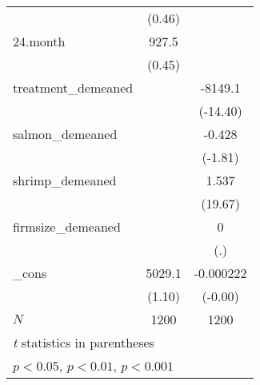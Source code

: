 {\begin{tabular}{l*{2}{c}}
            &      (0.46)         &                     \\
[1em]
24.month    &       927.5         &                     \\
            &      (0.45)         &                     \\
[1em]
treatment\_demeaned&                     &     -8149.1\sym{***}\\
            &                     &    (-14.40)         \\
[1em]
salmon\_demeaned&                     &      -0.428         \\
            &                     &     (-1.81)         \\
[1em]
shrimp\_demeaned&                     &       1.537\sym{***}\\
            &                     &     (19.67)         \\
[1em]
firmsize\_demeaned&                     &           0         \\
            &                     &         (.)         \\
[1em]
\_cons      &      5029.1         &   -0.000222         \\
            &      (1.10)         &     (-0.00)         \\
\hline
\(N\)       &        1200         &        1200         \\
\hline\hline
\multicolumn{3}{l}{\footnotesize \textit{t} statistics in parentheses}\\
\multicolumn{3}{l}{\footnotesize \sym{*} \(p<0.05\), \sym{**} \(p<0.01\), \sym{***} \(p<0.001\)}\\
\end{tabular}
}
